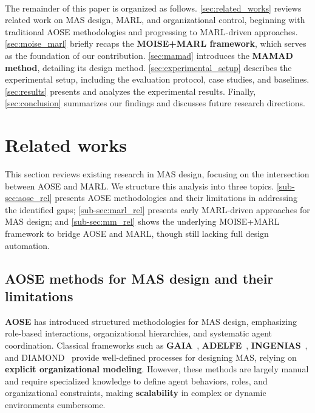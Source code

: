 \documentclass[journal]{IEEEtai}
\begin{document}
\

The remainder of this paper is organized as follows. \autoref{sec:related_works} reviews related work on MAS design, MARL, and organizational control, beginning with traditional AOSE methodologies and progressing to MARL-driven approaches. \autoref{sec:moise_marl} briefly recaps the \textbf{MOISE+MARL framework}, which serves as the foundation of our contribution. \autoref{sec:mamad} introduces the \textbf{MAMAD method}, detailing its design method. \autoref{sec:experimental_setup} describes the experimental setup, including the evaluation protocol, case studies, and baselines. \autoref{sec:results} presents and analyzes the experimental results. Finally, \autoref{sec:conclusion} summarizes our findings and discusses future research directions.

\clearpage

\section{Related works}\label{sec:related_works}

This section reviews existing research in MAS design, focusing on the intersection between AOSE and MARL. We structure this analysis into three topics. \autoref{sub-sec:aose_rel} presents AOSE methodologies and their limitations in addressing the identified gaps; \autoref{sub-sec:marl_rel} presents early MARL-driven approaches for MAS design; and \autoref{sub-sec:mm_rel} shows the underlying MOISE+MARL framework to bridge AOSE and MARL, though still lacking full design automation.

\subsection{AOSE methods for MAS design and their limitations}\label{sub-sec:aose_rel}

\textbf{AOSE} has introduced structured methodologies for MAS design, emphasizing role-based interactions, organizational hierarchies, and systematic agent coordination. Classical frameworks such as \textbf{GAIA}~\cite{gaia1998}, \textbf{ADELFE}~\cite{adelfe2002}, \textbf{INGENIAS}~\cite{ingenias2004}, and DIAMOND~\cite{Jamont2005} provide well-defined processes for designing MAS, relying on \textbf{explicit organizational modeling}. However, these methods are largely manual and require specialized knowledge to define agent behaviors, roles, and organizational constraints, making \textbf{scalability} in complex or dynamic environments cumbersome.
\end{document}
